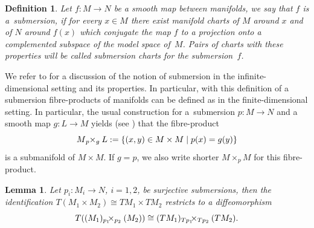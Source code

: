 \documentclass[pdftex]{sigma}
\numberwithin{equation}{section}
\newtheorem{Lemma}[Theorem]{Lemma}
\newtheorem{Definition}[Theorem]{Definition}
\begin{document}
\begin{Definition}\label{defn:submersion}
Let $f \colon M \rightarrow N$ be a smooth map between manifolds, we say that $f$ is a~\emph{submersion}, if for every $x \in M$ there exist manifold charts of $M$ around $x$ and of $N$ around $f(x)$ which conjugate the map $f$ to a projection onto a complemented subspace of the model space of~$M$. Pairs of charts with these properties will be called \emph{submersion charts} for the submersion~$f$.
\end{Definition}
We refer to \cite{glo16} for a discussion of the notion of submersion in the infinite-dimensional setting and its properties.
In particular, with this definition of a submersion fibre-products of manifolds can be defined as in the finite-dimensional setting. In particular, the usual construction for a~submersion $p\colon M \rightarrow N$ and a smooth map $g\colon L \rightarrow M$ yields (see \cite[Lemma 1.60]{Sch23}) that the fibre-product
\begin{displaymath}
 M {}_{p}\hspace{-.25em}\times_{g} L := \{(x,y) \in M\times M \mid p(x)=g(y)\}
\end{displaymath}
is a submanifold of $M\times M$. If $g=p$, we also write shorter $M\times_p M$ for this fibre-product.

\begin{Lemma}\label{lem:tangent_fibreprod}
Let $p_i \colon M_i \rightarrow N$, $i=1,2$, be surjective submersions, then the identification $T(M_1\times M_2) \cong TM_1 \times TM_2$ restricts to a diffeomorphism
\begin{displaymath}
 T((M_1) {}_{p_1}\hspace{-.5em}\times_{p_2} (M_2) ) \cong (TM_1) {}_{Tp_1}\hspace{-.5em}\times_{Tp_2} (TM_2).\end{displaymath}
\end{Lemma}
\end{document}
